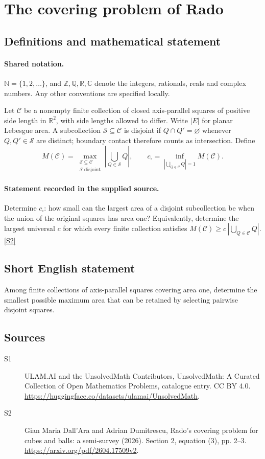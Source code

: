 \documentclass[11pt]{article}
\newcommand{\sref}[2]{\hyperlink{source:#1:#2}{[S#2]}}
\begin{document}
\section{The covering problem of Rado}\label{statement}

\subsection{Definitions and mathematical statement}

\paragraph{Shared notation.}$\mathbb N=\{1,2,\ldots\}$, and $\mathbb Z,\mathbb Q,\mathbb R,\mathbb C$ denote the integers, rationals, reals and complex numbers. Any other conventions are specified locally.


Let $\mathcal C$ be a nonempty finite collection of closed axis-parallel squares of positive side length in $\mathbb R^2$, with side lengths allowed to differ. Write $|E|$ for planar Lebesgue area. A subcollection $\mathcal S\subseteq\mathcal C$ is disjoint if $Q\cap Q'=\varnothing$ whenever $Q,Q'\in\mathcal S$ are distinct; boundary contact therefore counts as intersection. Define
\[M(\mathcal C)=\max_{\substack{\mathcal S\subseteq\mathcal C\\\mathcal S\text{ disjoint}}}\left|\bigcup_{Q\in\mathcal S}Q\right|,\qquad c_\square=\inf_{|\bigcup_{Q\in\mathcal C}Q|=1}M(\mathcal C).\]
\paragraph{Statement recorded in the supplied source.}
Determine $c_\square$: how small can the largest area of a disjoint subcollection be when the union of the original squares has area one? Equivalently, determine the largest universal $c$ for which every finite collection satisfies $M(\mathcal C)\geq c\,|\bigcup_{Q\in\mathcal C}Q|$. \sref{statement}{2}
\subsection{Short English statement}
Among finite collections of axis-parallel squares covering area one, determine the smallest possible maximum area that can be retained by selecting pairwise disjoint squares.
\subsection{Sources}
\begin{description}
\item[\hypertarget{source:statement:1}{S1}] ULAM.AI and the UnsolvedMath Contributors, UnsolvedMath: A Curated Collection of Open Mathematics Problems, catalogue entry. CC BY 4.0. \url{https://huggingface.co/datasets/ulamai/UnsolvedMath}.
\item[\hypertarget{source:statement:2}{S2}] Gian Maria Dall’Ara and Adrian Dumitrescu, Rado’s covering problem for cubes and balls: a semi-survey (2026). Section 2, equation (3), pp. 2–3. \url{https://arxiv.org/pdf/2604.17509v2}.
\end{description}
\label{end:statement}
\end{document}
